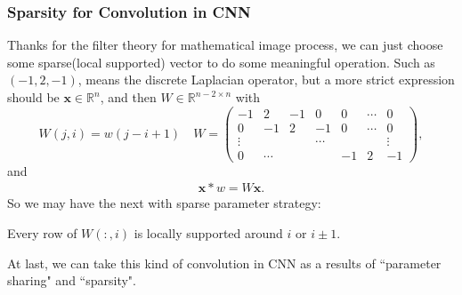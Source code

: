 \subsubsection{Sparsity for Convolution in CNN}
Thanks for the filter theory for mathematical image process, we can just choose some sparse(local supported) vector to do some meaningful operation. Such as   $(-1, 2, -1)$, means the discrete Laplacian operator, but a more strict expression should be $\bm x \in \mathbb{R}^n$, and then $W \in \mathbb{R}^{n-2 \times n}$ with 
\begin{equation}
W(j,i) = w(j - i + 1)  \quad  W = \begin{pmatrix}
-1 & 2 & -1 & 0 & 0&\cdots & 0 \\
0& -1 & 2 & -1 & 0 & \cdots & 0 \\
\vdots &  & & \cdots & & & \vdots \\
0& \cdots & & & -1 & 2& -1 
\end{pmatrix},
\end{equation}
and 
\begin{align}
\bm x\ast w = W \bm x.
\end{align}
So we may have the next with sparse parameter strategy:
\begin{definition}[Sparsity]
Every row of $W(:,i)$ is locally supported around $i$ or $i \pm 1$.  
\end{definition}

At last, we can take this kind of convolution in CNN as a results of ``parameter sharing" and ``sparsity". 

